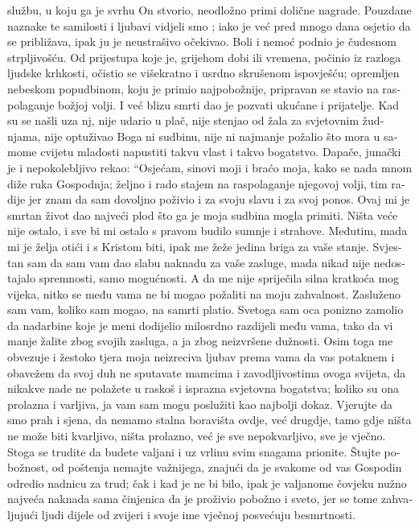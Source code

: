 \documentclass[a5paper,twoside]{article}
\begin{document}
\begin{pages}
\begin{Rightside}
\begin{croatian}
službu, u koju ga je svrhu On stvorio, neodložno primi dolične nagrade.  
\pend
\pstart
Pouzdane naznake te samilosti i ljubavi vidjeli smo ; iako je već pred mnogo dana osjetio da se približava, ipak ju je neustrašivo očekivao.  Boli i nemoć podnio je čudesnom strpljivošću.  Od prijestupa koje je, grijehom dobi ili vremena, počinio iz razloga ljudske krhkosti, očistio se višekratno i usrdno skrušenom ispovješću; opremljen nebeskom popudbinom, koju je primio najpobožnije, pripravan se stavio na raspolaganje božjoj volji.  I već blizu smrti dao je pozvati ukućane i prijatelje. Kad su se našli uza nj, nije udario u plač, nije stenjao od žala za svjetovnim žudnjama, nije optuživao Boga ni sudbinu, nije ni najmanje požalio što mora u samome cvijetu mladosti napustiti takvu vlast i takvo bogatstvo. Dapače, junački je i nepokolebljivo rekao: ``Osjećam, sinovi moji i braćo moja, kako se nada mnom diže ruka Gospodnja; željno i rado stajem na raspolaganje njegovoj volji, tim radije jer znam da sam dovoljno poživio i za svoju slavu i za svoj ponos.  Ovaj mi je smrtan život dao najveći plod što ga je moja sudbina mogla primiti. Ništa veće nije ostalo, i sve bi mi ostalo s pravom budilo sumnje i strahove.  Međutim, mada mi je želja otići i s Kristom biti, ipak me žeže jedina briga za vaše stanje. Svjestan sam da sam vam dao slabu naknadu za vaše zasluge, mada nikad nije nedostajalo spremnosti, samo mogućnosti.  A da me nije spriječila silna kratkoća mog vijeka, nitko se među vama ne bi mogao požaliti na moju zahvalnost.  Zasluženo sam vam, koliko sam mogao, na samrti platio. Svetoga sam oca ponizno zamolio da nadarbine koje je meni dodijelio milosrdno razdijeli među vama, tako da vi manje žalite zbog svojih zasluga, a ja zbog neizvršene dužnosti.  Osim toga me obvezuje i žestoko tjera moja neizreciva ljubav prema vama da vas potaknem i obavežem da svoj duh ne sputavate mamcima i zavodljivostima ovoga svijeta, da nikakve nade ne polažete u raskoš i isprazna svjetovna bogatstva; koliko su ona prolazna i varljiva, ja vam sam mogu poslužiti kao najbolji dokaz.  Vjerujte da smo prah i sjena, da nemamo stalna boravišta ovdje, već drugdje, tamo gdje ništa ne može biti kvarljivo, ništa prolazno, već je sve nepokvarljivo, sve je vječno.  Stoga se trudite da budete valjani i uz vrlinu svim snagama prionite. Štujte pobožnost, od poštenja nemajte važnijega, znajući da je svakome od vas Gospodin odredio nadnicu za trud; čak i kad je ne bi bilo, ipak je valjanome čovjeku nužno najveća naknada sama činjenica da je proživio pobožno i sveto, jer se tome zahvaljujući ljudi dijele od zvijeri i svoje ime vječnoj posvećuju besmrtnosti. 

\end{croatian}
\end{Rightside}
\end{pages}
\end{document}
